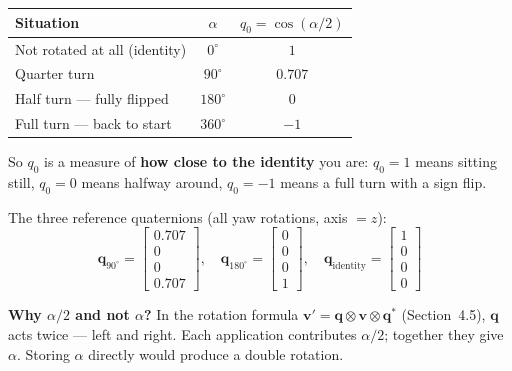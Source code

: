 \documentclass[12pt, a4paper]{article}
\begin{document}
\begin{notebox}
  \medskip
  \begin{center}
  \begin{tabular}{@{} l c c @{}}
    \toprule
    Situation & $\alpha$ & $q_0 = \cos(\alpha/2)$ \\
    \midrule
    Not rotated at all (identity) & $0^\circ$   & $1$    \\
    Quarter turn                  & $90^\circ$  & $0.707$\\
    Half turn --- fully flipped   & $180^\circ$ & $0$    \\
    Full turn --- back to start   & $360^\circ$ & $-1$   \\
    \bottomrule
  \end{tabular}
  \end{center}

  \medskip
  So $q_0$ is a measure of \textbf{how close to the identity} you are:
  $q_0 = 1$ means sitting still, $q_0 = 0$ means halfway around,
  $q_0 = -1$ means a full turn with a sign flip.

  The three reference quaternions (all yaw rotations, axis $= z$):
  \[
    \mathbf{q}_{90^\circ}
    = \begin{bmatrix} 0.707 \\ 0 \\ 0 \\ 0.707 \end{bmatrix}, \quad
    \mathbf{q}_{180^\circ}
    = \begin{bmatrix} 0 \\ 0 \\ 0 \\ 1 \end{bmatrix}, \quad
    \mathbf{q}_\text{identity}
    = \begin{bmatrix} 1 \\ 0 \\ 0 \\ 0 \end{bmatrix}
  \]

  \textbf{Why $\alpha/2$ and not $\alpha$?}
  In the rotation formula $\mathbf{v}' = \mathbf{q}\otimes\mathbf{v}
  \otimes\mathbf{q}^*$ (Section~4.5), $\mathbf{q}$ acts twice ---
  left and right.
  Each application contributes $\alpha/2$; together they give $\alpha$.
  Storing $\alpha$ directly would produce a double rotation.
\end{notebox}
\end{document}
